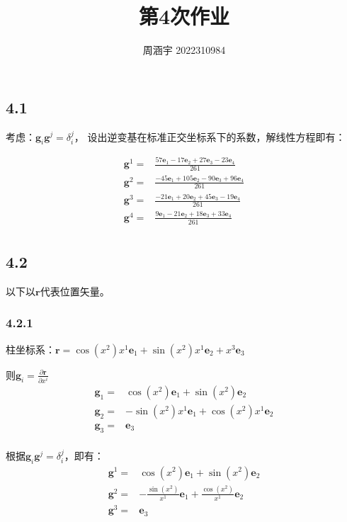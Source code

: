 \documentclass[UTF8,zihao=5]{ctexart}
\title{{\bfseries 第4次作业}}
\author{周涵宇 2022310984}
\date{}
\newcommand{\bm}[1]{{\mathbf{#1}}}
\newcommand*{\pd}[2]{\frac{\partial #1}{\partial #2}}
\begin{document}
\maketitle

\subsection*{4.1}

考虑：$\bm{g}_i\bm{g}^j=\delta_i^j$，
设出逆变基在标准正交坐标系下的系数，解线性方程即有：

$$
    \begin{aligned}
        \bm{g}^1= & \frac{ 57\bm{e}_1 -17\bm{e}_2 +27\bm{e}_3 -23\bm{e}_4}{261} \\
        \bm{g}^2= & \frac{-45\bm{e}_1+105\bm{e}_2 -90\bm{e}_3 +96\bm{e}_4}{261} \\
        \bm{g}^3= & \frac{-21\bm{e}_1 +20\bm{e}_2 +45\bm{e}_3 -19\bm{e}_4}{261} \\
        \bm{g}^4= & \frac{  9\bm{e}_1 -21\bm{e}_2 +18\bm{e}_3 +33\bm{e}_4}{261} \\
    \end{aligned}
$$

\subsection*{4.2}

以下以$\bm{r}$代表位置矢量。

\subsubsection*{4.2.1}

柱坐标系：$\bm{r}= \cos{(x^2)} x^1 \bm{e}_1 + \sin{(x^2)} x^1 \bm{e}_2 + x^3 \bm{e}_3$

则$\bm{g}_i=\pd{\bm{r}}{x^i}$
$$
    \begin{aligned}
        \bm{g}_1 = & \cos{(x^2)}\bm{e}_1 + \sin{(x^2)}\bm{e}_2        \\
        \bm{g}_2 = & -\sin{(x^2)}x^1\bm{e}_1 + \cos{(x^2)}x^1\bm{e}_2 \\
        \bm{g}_3 = & \bm{e}_3                                         \\
    \end{aligned}
$$

根据$\bm{g}_i\bm{g}^j=\delta_i^j$，即有：
$$
    \begin{aligned}
        \bm{g}^1 = & \cos{(x^2)}\bm{e}_1 + \sin{(x^2)}\bm{e}_2                          \\
        \bm{g}^2 = & -\frac{\sin{(x^2)}}{x^1}\bm{e}_1 + \frac{\cos{(x^2)}}{x^1}\bm{e}_2 \\
        \bm{g}^3 = & \bm{e}_3                                                           \\
    \end{aligned}
$$
\end{document}

